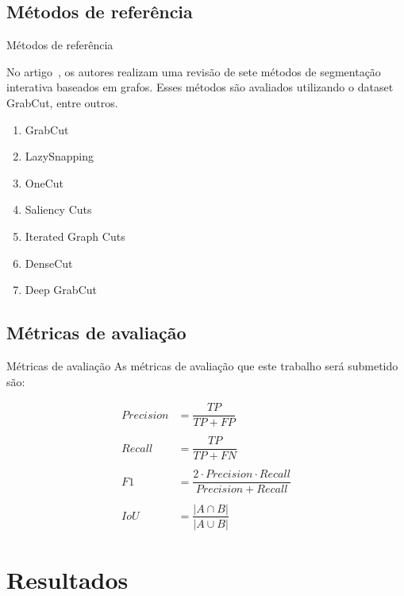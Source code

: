 \documentclass{templatebeamerufc/libs/ufc_format}
\begin{document}
\subsection{Métodos de referência}
\begin{frame}{Métodos de referência}

No artigo~\cite{wang2023review}, os autores realizam uma revisão de
sete métodos de segmentação interativa baseados em grafos. Esses
métodos são avaliados utilizando o dataset GrabCut, entre outros.

\begin{enumerate}
    \item GrabCut
    \item LazySnapping
    \item OneCut
    \item Saliency Cuts
    \item Iterated Graph Cuts
    \item DenseCut
    \item Deep GrabCut
\end{enumerate}

\end{frame}

\subsection{Métricas de avaliação}
\begin{frame}{Métricas de avaliação}
  As métricas de avaliação que este trabalho será submetido são:


  \begin{equation*}\label{eq:metricas}
    \begin{aligned}
      Precision &= \dfrac{TP}{TP + FP} \\~\\
      Recall &= \dfrac{TP}{TP + FN} \\~\\
      F1 &= \dfrac{2 \cdot Precision \cdot Recall}{Precision + Recall} \\~\\
      IoU &= \dfrac{\left| A \cap B \right|}{\left| A \cup B \right|}
    \end{aligned}
  \end{equation*}

\end{frame}


\section{Resultados}
\end{document}
